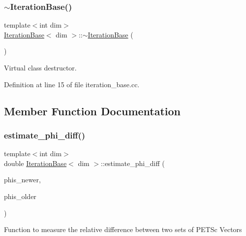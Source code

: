 \subsubsection{\texorpdfstring{$\sim$\+Iteration\+Base()}{~IterationBase()}}
{\footnotesize\ttfamily template$<$int dim$>$ \\
\hyperlink{class_iteration_base}{Iteration\+Base}$<$ dim $>$\+::$\sim$\hyperlink{class_iteration_base}{Iteration\+Base} (\begin{DoxyParamCaption}{ }\end{DoxyParamCaption})\hspace{0.3cm}{\ttfamily [virtual]}}



Virtual class destructor. 



Definition at line 15 of file iteration\+\_\+base.\+cc.



\subsection{Member Function Documentation}
\mbox{\label{class_iteration_base_a8bcba214850c5d47f5ae38fb98f51a44}} 
\subsubsection{\texorpdfstring{estimate\+\_\+phi\+\_\+diff()}{estimate\_phi\_diff()}\hspace{0.1cm}{\footnotesize\ttfamily [1/4]}}
{\footnotesize\ttfamily template$<$int dim$>$ \\
double \hyperlink{class_iteration_base}{Iteration\+Base}$<$ dim $>$\+::estimate\+\_\+phi\+\_\+diff (\begin{DoxyParamCaption}\item[{std\+::vector$<$ P\+E\+T\+Sc\+Wrappers\+::\+M\+P\+I\+::\+Vector $\ast$$>$ \&}]{phis\+\_\+newer,  }\item[{std\+::vector$<$ P\+E\+T\+Sc\+Wrappers\+::\+M\+P\+I\+::\+Vector $\ast$$>$ \&}]{phis\+\_\+older }\end{DoxyParamCaption})\hspace{0.3cm}{\ttfamily [protected]}}

Function to measure the relative difference between two sets of P\+E\+T\+Sc Vectors


